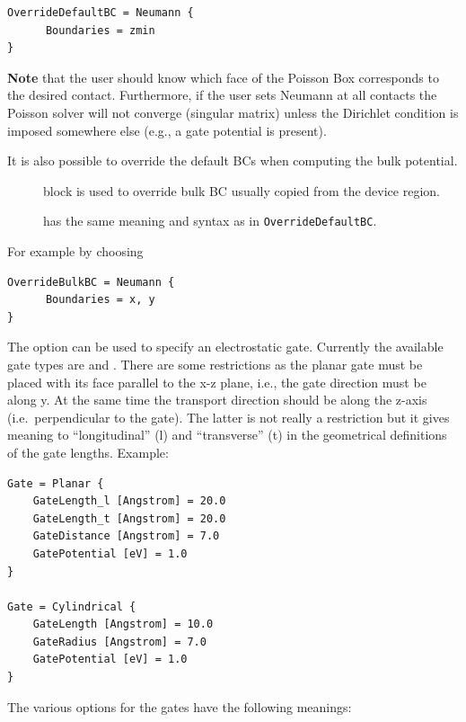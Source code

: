 \begin{verbatim}
OverrideDefaultBC = Neumann {
      Boundaries = zmin
}
\end{verbatim}

{\bf Note} that the user should know which face of the Poisson Box corresponds
to the desired contact. Furthermore, if the user sets Neumann at all contacts
the Poisson solver will not converge (singular matrix) unless the Dirichlet
condition is imposed somewhere else (e.g., a gate potential is present).

It is also possible to override the default BCs when computing the bulk
potential.

\begin{description}
\item[] block is used to override bulk BC usually copied from
  the device region.
\item[] has the same meaning and syntax as in
  \verb|OverrideDefaultBC|.
\end{description}

For example by choosing
\begin{verbatim}
OverrideBulkBC = Neumann {
      Boundaries = x, y
}
\end{verbatim}




The option  can be used to specify an electrostatic gate. Currently the
available gate types are  and .  There are some
restrictions as the planar gate must be placed with its face parallel to the x-z
plane, i.e., the gate direction must be along y. At the same time the transport
direction should be along the z-axis (i.e.\ perpendicular to the gate). The
latter is not really a restriction but it gives meaning to ``longitudinal'' (l)
and ``transverse'' (t) in the geometrical definitions of the gate
lengths. Example:
\begin{verbatim}
Gate = Planar {
    GateLength_l [Angstrom] = 20.0
    GateLength_t [Angstrom] = 20.0
    GateDistance [Angstrom] = 7.0
    GatePotential [eV] = 1.0
}

Gate = Cylindrical {
    GateLength [Angstrom] = 10.0
    GateRadius [Angstrom] = 7.0
    GatePotential [eV] = 1.0
}
\end{verbatim}

The various options for the gates have the following meanings:

